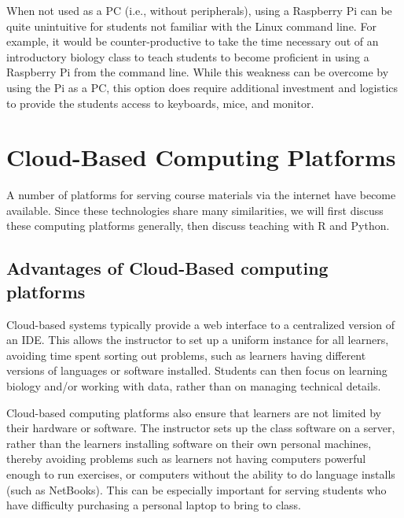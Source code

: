 When not used as a PC (i.e., without peripherals), using a Raspberry Pi can be
quite unintuitive for students not familiar with the Linux command line.
For example, it would be counter-productive to take the time necessary
out of an introductory biology class to teach students to become proficient
in using a Raspberry Pi from the command line.
While this weakness can be overcome by using the Pi as a PC, this option does
require additional investment and logistics to provide the students access to
keyboards, mice, and monitor.


\section{Cloud-Based Computing Platforms}

A number of platforms for serving course materials via the internet have become available. 
Since these technologies share many similarities, we will first discuss these computing platforms generally,
then discuss teaching with R and Python.


\subsection{Advantages of Cloud-Based computing platforms}\label{subsub:cloud-advantage}

Cloud-based systems typically provide a web interface to a centralized version of an IDE. This 
allows the instructor to set up a uniform instance for all learners, avoiding time spent sorting out problems, such as learners having different versions of languages or software installed.
Students can then focus on learning biology and/or working with data, rather than on managing technical details.

Cloud-based computing platforms also ensure that learners
are not limited by their hardware or software. The instructor sets up the class software on a server, rather than the learners installing software on their own personal machines, thereby avoiding problems such as learners not having computers powerful enough to run exercises, or computers without the ability to do language installs (such as NetBooks). This can be especially important for serving students who have difficulty purchasing a personal laptop to bring to class.

